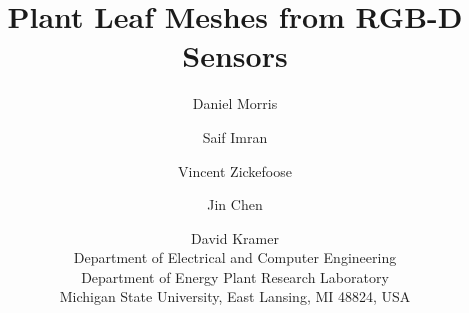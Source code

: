 \documentclass[10pt,twocolumn,letterpaper]{article}
\begin{document}
\title{Plant Leaf Meshes from RGB-D Sensors}

\author{ 
Daniel Morris \and Saif Imran \and Vincent Zickefoose \and Jin Chen \and David Kramer\\
Department of Electrical and Computer Engineering\\
Department of Energy Plant Research Laboratory\\
Michigan State University, East Lansing, MI 48824, USA
}

\maketitle

\begin{abstract}

\end{abstract}
















{\small


}
\end{document}
